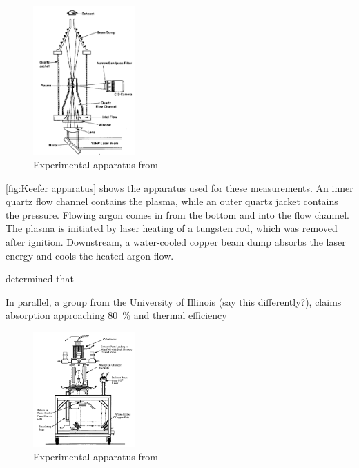         \begin{figure}[h]
            \centering
            \includegraphics[width=0.35\textwidth]{assets/2 background/UTSI (Keefer) Apparatus.png}
            \caption{Experimental apparatus from \textcite{keeferPowerAbsorptionLasersustained1986a}}
            \label{fig:Keefer apparatus}
        \end{figure}
        
        \autoref{fig:Keefer apparatus} shows the apparatus used for these measurements. An inner quartz flow channel contains the plasma, while an outer quartz jacket contains the pressure. Flowing argon comes in from the bottom and into the flow channel. The plasma is initiated by laser heating of a tungsten rod, which was removed after ignition. Downstream, a water-cooled copper beam dump absorbs the laser energy and cools the heated argon flow.

         determined that %

        In parallel, a group from the University of Illinois (say this differently?), claims absorption approaching \qty{80}{\%} and thermal efficiency

        \begin{figure}[h]
            \centering
            \includegraphics[width=0.35\textwidth]{assets/2 background/Illinois (Krier) Apparatus.png}
            \caption{Experimental apparatus from \textcite{zerkleLasersustainedArgonPlasmas1990}}
            \label{fig:Krier apparatus}
        \end{figure}

